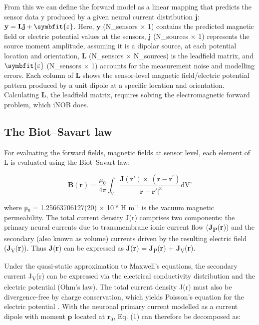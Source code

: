 \documentclass[11pt]{article}
\begin{document}
From this we can define the forward model as a linear mapping that
predicts the sensor data y produced by a given neural current
distribution \(\mathbf{j}\): \(\mathbf{y} = \mathbf{L}\mathbf{j} + \symbfit{\varepsilon}\). Here, \(\mathbf{y}\) (N\_sensors × 1) contains the
predicted magnetic field or electric potential values at the sensors, \(\mathbf{j}\)
(N\_sources × 1) represents the source moment amplitude, assuming it is
a dipolar source, at each potential location and orientation, \(\mathbf{L}\)
(N\_sensors × N\_sources) is the leadfield matrix, and \(\symbfit{\varepsilon}\) (N\_sensors ×
1) accounts for the measurement noise and modelling errors. Each column
of \(\mathbf{L}\) shows the sensor-level magnetic field/electric potential pattern
produced by a unit dipole at a specific location and orientation.
Calculating \textbf{L}, the leadfield matrix, requires solving the
electromagnetic forward problem, which iNOB does.

\subsection{The Biot--Savart law}\label{the-biot-savart-law}

For evaluating the forward fields, magnetic fields at sensor level,
each element of L is evaluated using the Biot--Savart law:

\begin{equation}
\mathbf{B}\left( \mathbf{r} \right) = \frac{\mu_{0}}{4\pi}\int_{V}^{}\frac{\mathbf{J}\left( \mathbf{r}' \right) \times \ \left( \mathbf{r} - \mathbf{r}^{\mathbf{'}} \right)}{\left| \mathbf{r} - \mathbf{r}' \right|^{3}}\text{dV'}
\tag{1}
\end{equation}

where μ₀ = 1.25663706127(20) × 10⁻⁶ H m⁻¹ \citep{248} is the vacuum
magnetic permeability. The total current density J(r) comprises two
components: the primary neural currents due to transmembrane ionic
current flow (\textbf{J\textsubscript{P}}(\textbf{r})) and the secondary
(also known as volume) currents driven by the resulting electric field
(\textbf{J}\textsubscript{V}(\textbf{r})). Thus \textbf{J}(\textbf{r})
can be expressed as \textbf{J}(\textbf{r}) =
\textbf{J}\textsubscript{P}(\textbf{r}) +
\textbf{J}\textsubscript{V}(\textbf{r}).

Under the quasi-static approximation to Maxwell's
equations, the secondary current J\textsubscript{V}(r) can be expressed
via the electrical conductivity distribution and the electric potential
(Ohm's law). The total current density J(r) must also be
divergence-free by charge conservation, which yields
Poisson's equation for the electric potential
\citep{226}. With the neuronal primary current modelled as a current dipole
with moment \(\mathbf{p}\) located at \(\mathbf{r}_0\), Eq. (1) can therefore be decomposed as:
\end{document}
